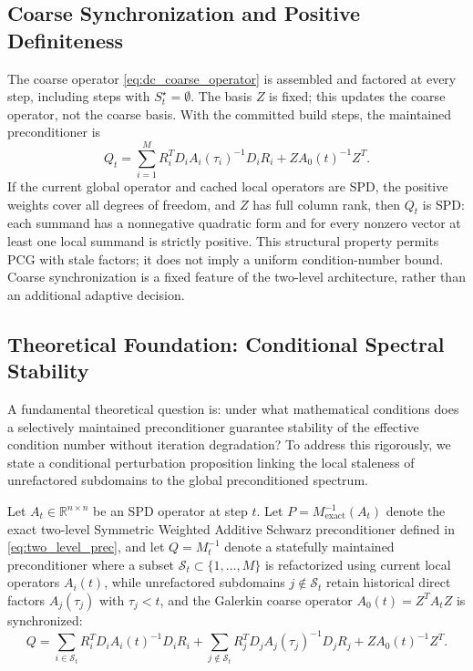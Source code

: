 \subsection{Coarse Synchronization and Positive Definiteness}
The coarse operator \eqref{eq:dc_coarse_operator} is assembled and factored at
every step, including steps with $S_t^\star=\emptyset$. The basis $Z$ is fixed;
this updates the coarse operator, not the coarse basis. With the committed
build steps, the maintained preconditioner is
\begin{equation}
Q_t=\sum_{i=1}^M R_i^T D_i A_i(\tau_i)^{-1}D_i R_i
       +Z A_0(t)^{-1}Z^T.
\label{eq:dc_maintained_preconditioner}
\end{equation}
If the current global operator and cached local operators are SPD, the positive
weights cover all degrees of freedom, and $Z$ has full column rank, then $Q_t$
is SPD: each summand has a nonnegative quadratic form and for every nonzero
vector at least one local summand is strictly positive. This structural
property permits PCG with stale factors; it does not imply a uniform
condition-number bound. Coarse synchronization is a fixed feature of the
two-level architecture, rather than an additional adaptive decision.

\subsection{Theoretical Foundation: Conditional Spectral Stability}
\label{subsec:theory_stability}

A fundamental theoretical question is: under what mathematical conditions does a selectively maintained preconditioner guarantee stability of the effective condition number without iteration degradation? To address this rigorously, we state a conditional perturbation proposition linking the local staleness of unrefactored subdomains to the global preconditioned spectrum.

Let $A_t \in \mathbb{R}^{n \times n}$ be an SPD operator at step $t$. Let $P = M_{\text{exact}}^{-1}(A_t)$ denote the exact two-level Symmetric Weighted Additive Schwarz preconditioner defined in \eqref{eq:two_level_prec}, and let $Q = M_t^{-1}$ denote a statefully maintained preconditioner where a subset $\mathcal{S}_t \subset \{1, \dots, M\}$ is refactorized using current local operators $A_i(t)$, while unrefactored subdomains $j \notin \mathcal{S}_t$ retain historical direct factors $A_j(\tau_j)$ with $\tau_j < t$, and the Galerkin coarse operator $A_0(t) = Z^T A_t Z$ is synchronized:
\begin{equation}
Q = \sum_{i \in \mathcal{S}_t} R_i^T D_i A_i(t)^{-1} D_i R_i + \sum_{j \notin \mathcal{S}_t} R_j^T D_j A_j(\tau_j)^{-1} D_j R_j + Z A_0(t)^{-1} Z^T.
\label{eq:stateful_prec_decomp}
\end{equation}

